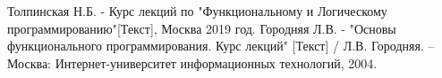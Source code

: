 \newpage
{}

\begin{thebibliography}{}
      Толпинская Н.Б.  -  Курс лекций по "Функциональному и Логическому программированию"[Текст], Москва 2019 год.
      Городняя Л.В.  -  "Основы функционального программирования. Курс лекций" [Текст] / Л.В. Городняя.    – Москва: Интернет-университет информационных технологий,  2004.
\end{thebibliography}
